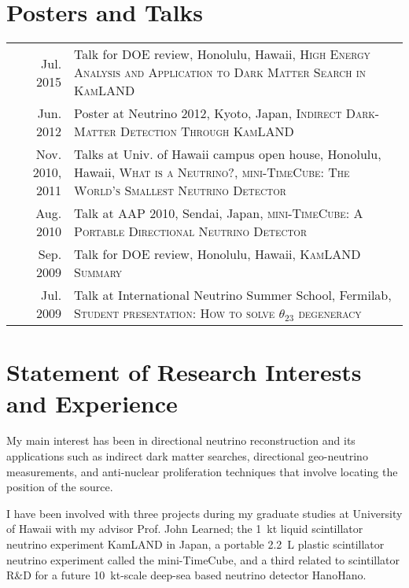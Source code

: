 \documentclass[a4paper,10pt]{article} %
\begin{document}
\section{Posters and Talks}
\begin{tabular}{rp{11cm}}
	Jul. 2015 & Talk for DOE review, Honolulu, Hawaii,
	\textsc{High Energy Analysis and Application to Dark Matter Search in KamLAND}\\
	Jun. 2012 & Poster at Neutrino 2012, Kyoto, Japan, \textsc{Indirect
	Dark-Matter Detection Through KamLAND}\\
	Nov. 2010, 2011 & Talks at Univ. of Hawaii campus open house, Honolulu,
	Hawaii, \textsc{What is a Neutrino?}, \textsc{mini-TimeCube: The World's
		Smallest Neutrino Detector}\\
	Aug. 2010 & Talk at AAP 2010, Sendai, Japan, \textsc{mini-TimeCube: A
	Portable Directional Neutrino Detector}\\
	Sep. 2009 & Talk for DOE review, Honolulu, Hawaii, \textsc{KamLAND
Summary}\\
	Jul. 2009 & Talk at International Neutrino Summer School, Fermilab,
\textsc{Student presentation: How to solve $\theta_{23}$ degeneracy}\\
	
\end{tabular}


\section{Statement of Research Interests and Experience}
My main interest has been in directional neutrino reconstruction and its
applications such as indirect dark matter searches, directional geo-neutrino
measurements, and anti-nuclear proliferation techniques that involve locating
the position of the source.

I have been involved with three projects during my graduate studies at
University of Hawaii with my advisor Prof. John Learned; the \SI{1}{\kilo\tonne}
liquid scintillator neutrino experiment KamLAND in Japan, a portable
\SI{2.2}{\liter} plastic scintillator neutrino experiment called the
mini-TimeCube, and a third related to scintillator R\&D for a future
\SI{10}{\kilo\tonne}-scale deep-sea based neutrino detector HanoHano.
\end{document}

